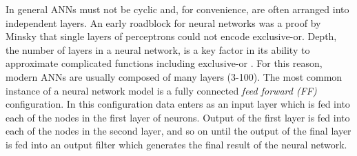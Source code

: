 




In general ANNs 
must not be cyclic and, for convenience, are often arranged into
independent layers. An early roadblock for neural networks was a proof by Minsky \cite{minsky1969perceptrons} that single layers of perceptrons could not encode exclusive-or. Depth, the number of layers in a neural network, is a key factor in its ability to approximate complicated functions including exclusive-or \cite{kak1993training}. For this reason, modern ANNs are usually composed of many layers (3-100). The most common instance of a neural network model is a fully connected \emph{feed forward (FF)} configuration. In this configuration data enters as an input layer which is fed into each of the nodes in the first layer of neurons. Output of the first layer is fed into each of the nodes in the second layer, and so on until the output of the final layer is fed into an output filter which generates the final result of the neural network. 




